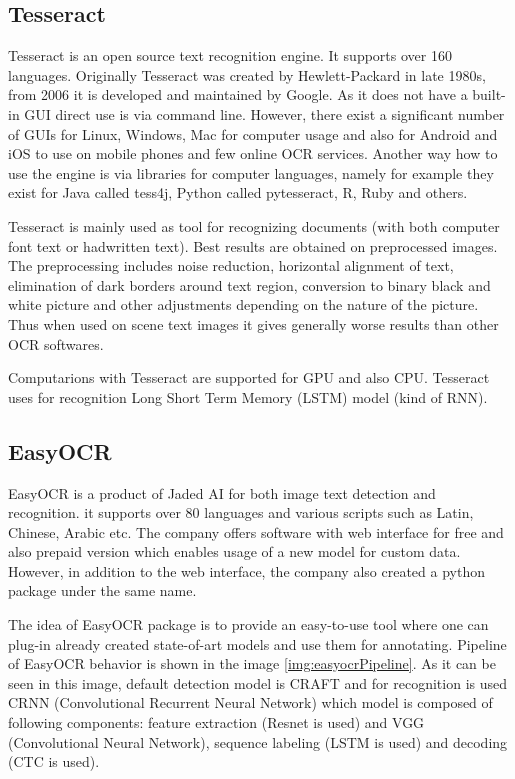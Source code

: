 \subsection{Tesseract}

Tesseract is an open source text recognition engine. It supports over 160 languages. Originally Tesseract was created by Hewlett-Packard in late 1980s, from 2006 it is developed and maintained by Google. As it does not have a built-in GUI direct use is via command line. However, there exist a significant number of GUIs for Linux, Windows, Mac for computer usage and also for Android and iOS to use on mobile phones and few online OCR services. Another way how to use the engine is via libraries for computer languages, namely for example they exist for Java called tess4j, Python called pytesseract, R, Ruby and others. \cite{tesseract1}

Tesseract is mainly used as tool for recognizing documents (with both computer font text or hadwritten text). Best results are obtained on preprocessed images. The preprocessing includes noise reduction, horizontal alignment of text, elimination of dark borders around text region, conversion to binary black and white picture and other adjustments depending on the nature of the picture. Thus when used on scene text images it gives generally worse results than other OCR softwares. 

Computarions with Tesseract are supported for GPU and also CPU. Tesseract uses for recognition Long Short Term Memory (LSTM) model (kind of RNN).

\subsection{EasyOCR}

EasyOCR is a product of Jaded AI for both image text detection and recognition. it supports over 80 languages and various scripts such as Latin, Chinese, Arabic etc. The company offers software with web interface for free and also prepaid version which enables usage of a new model for custom data. However, in addition to the web interface, the company also created a python package under the same name.\cite{easyocr1}

The idea of EasyOCR package is to provide an easy-to-use tool where one can plug-in already created state-of-art models and use them for annotating. Pipeline of EasyOCR behavior is shown in the image \ref*{img:easyocrPipeline}. As it can be seen in this image, default detection model is CRAFT and for recognition is used CRNN (Convolutional Recurrent Neural Network) which model is composed of following components: feature extraction (Resnet is used) and VGG (Convolutional Neural Network), sequence labeling (LSTM is used) and decoding (CTC is used).\cite{easyocr2}

